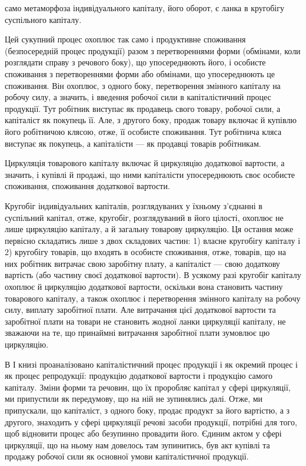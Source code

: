 \parcont{}  %
само метаморфоза індивідуального капіталу, його оборот, є ланка в кругобігу
суспільного капіталу.

Цей сукупний процес охоплює так само і продуктивне споживання
(безпосередній процес продукції) разом з перетвореннями форми (обмінами,
коли розглядати справу з речового боку), що упосереднюють його,
і особисте споживання з перетвореннями форми або обмінами, що упосереднюють
це споживання. Він охоплює, з одного боку, перетворення
змінного капіталу на робочу силу, а значить, і введення робочої сили в
капіталістичний процес продукції. Тут робітник виступає як продавець
свого товару, робочої сили, а капіталіст як покупець її. Але, з другого
боку, продаж товару включає й купівлю його робітничою клясою, отже, її
особисте споживання. Тут робітнича кляса виступає як покупець, а капіталісти
— як продавці товарів робітникам.

Циркуляція товарового капіталу включає й циркуляцію додаткової
вартости, а значить, і купівлі й продажі, що ними капіталісти упосереднюють
своє особисте споживання, споживання додаткової вартости.

Кругобіг індивідуальних капіталів, розглядуваних у їхньому з’єднанні
в суспільний капітал, отже, кругобіг, розглядуваний в його цілості, охоплює
не лише циркуляцію капіталу, а й загальну товарову циркуляцію.
Ця остання може первісно складатись лише з двох складових частин:
1) власне кругобігу капіталу і 2) кругобігу товарів, що входять в особисте
споживання, отже, товарів, що на них робітник витрачає свою заробітну
плату, а капіталіст — свою додаткову вартість (або частину своєї
додаткової вартости). В усякому разі кругобіг капіталу охоплює й циркуляцію
додаткової вартости, оскільки вона становить частину товарового
капіталу, а також охоплює і перетворення змінного капіталу на робочу
силу, виплату заробітної плати. Але витрачання цієї додаткової вартости
та заробітної плати на товари не становить жодної ланки циркуляції
капіталу, не зважаючи на те, що принаймні витрачання заробітної плати
зумовлює цю циркуляцію.

В І книзі проаналізовано капіталістичний процес продукції і як окремий
процес і як процес репродукції: продукцію додаткової вартости
і продукцію самого капіталу. Зміни форми та речовин, що їх проробляє
капітал у сфері циркуляції, ми припустили як передумову, що на
ній не зупинялись далі. Отже, ми припускали, що капіталіст, з одного
боку, продає продукт за його вартістю, а з другого, знаходить у сфері
циркуляції речові засоби продукції, потрібні для того, щоб відновити
процес або безупинно провадити його. Єдиним актом у сфері циркуляції,
що на ньому нам довелось там зупинитись, був акт купівлі та продажу
робочої сили як основної умови капіталістичної продукції.

